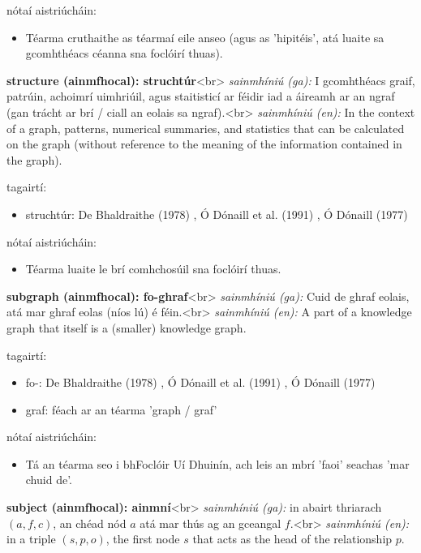\documentclass{article}
\begin{document}
nótaí aistriúcháin:
\begin{itemize}
	\item Téarma cruthaithe as téarmaí eile anseo (agus as 'hipitéis', atá luaite sa gcomhthéacs céanna sna foclóirí thuas).
\end{itemize}


\textbf{structure (ainmfhocal): struchtúr}<br>
\textit{sainmhíniú (ga):} I gcomhthéacs graif, patrúin, achoimrí uimhriúil, agus staitisticí ar féidir iad a áireamh ar an ngraf (gan trácht ar brí / ciall an eolais sa ngraf).<br>
\textit{sainmhíniú (en):} In the context of a graph, patterns, numerical summaries, and statistics that can be calculated on the graph (without reference to the meaning of the information contained in the graph).

tagairtí:
\begin{itemize}
	\item struchtúr: De Bhaldraithe (1978) \cite{de-bhaldraithe}, Ó Dónaill et al. (1991) \cite{focloir-beag}, Ó Dónaill (1977) \cite{odonaill}
\end{itemize}

nótaí aistriúcháin:
\begin{itemize}
	\item Téarma luaite le brí comhchosúil sna foclóirí thuas.
\end{itemize}


\textbf{subgraph (ainmfhocal): fo-ghraf}<br>
\textit{sainmhíniú (ga):} Cuid de ghraf eolais, atá mar ghraf eolas (níos lú) é féin.<br>
\textit{sainmhíniú (en):} A part of a knowledge graph that itself is a (smaller) knowledge graph.

tagairtí:
\begin{itemize}
	\item fo-: De Bhaldraithe (1978) \cite{de-bhaldraithe}, Ó Dónaill et al. (1991) \cite{focloir-beag}, Ó Dónaill (1977) \cite{odonaill}
	\item graf: féach ar an téarma 'graph / graf'
\end{itemize}

nótaí aistriúcháin:
\begin{itemize}
	\item Tá an téarma seo i bhFoclóir Uí Dhuinín, ach leis an mbrí 'faoi' seachas 'mar chuid de'.
\end{itemize}


\textbf{subject (ainmfhocal): ainmní}<br>
\textit{sainmhíniú (ga):} in abairt thriarach $(a,f,c)$, an chéad nód $a$ atá mar thús ag an gceangal $f$.<br>
\textit{sainmhíniú (en):} in a triple $(s,p,o)$, the first node $s$ that acts as the head of the relationship $p$.
\end{document}
